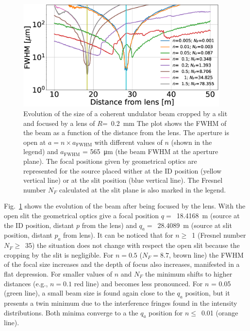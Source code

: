 \documentclass{iucr}              %
\begin{document}
\begin{figure}\label{fig:oneTFund}
\centering
\includegraphics[width=0.95\textwidth]{figures/oneTF_UndSource_RectSlit_R200um.eps}
\caption{Evolution of the size of a coherent undulator beam cropped by a slit and focused by a lens of $R$=~\SI{0.2}{\milli\meter} 
The plot shows the FWHM of the beam  as a function of the distance from the lens. The aperture is open at $a = n \times a_\text{FWHM}$ with different values of $n$ (shown in the legend) and $a_\text{FWHM}$ = \SI{565}{\micro\meter} (the beam FWHM at the aperture plane). The focal positions given by geometrical optics are represented for the source placed wither at the ID position (yellow vertical line) or at the slit position (blue vertical line).
The Fresnel number $N_F$ calculated at the slit plane is also marked in the legend.
}
\end{figure}

Fig.~\ref{fig:oneTFund} shows the evolution of the beam after being focused by the lens. With the open slit the geometrical optics give a focal position $q=$~\SI{18.4168}{\meter} (source at the ID position, distant $p$ from the lens) and $q_a=$~\SI{28.4089}{\meter} (source at slit position, distant $p_a$ from lens). It can be noticed that for $n\ge$~1 (Fresnel number $N_F\ge$~35) the situation does not change with respect the open slit because the cropping by the slit is negligible. For $n=0.5$ ($N_F=8.7$, brown line) the FWHM of the focal size increases and the depth of focus also increases, manifested in a flat depression. For smaller values of $n$ and $N_F$ the minimum shifts to higher distances (e.g., $n=0.1$ red line) and becomes less pronounced. For $n$ = 0.05 (green line), a small beam size is found again close to the $q_a$ position, but it presents a twin minimum due to the interference fringes found in the intensity distributions. Both minima converge to a the $q_a$ position for $n\le$~0.01 (orange line). 
\end{document}
